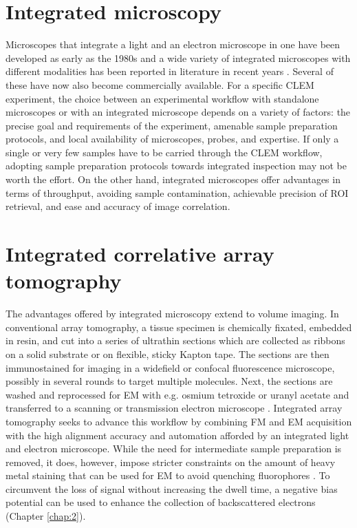 \section{Integrated microscopy}
\label{sec:1_integrated}

Microscopes that integrate a light and an electron microscope in one have been developed as early as the 1980s and a wide variety of integrated microscopes with different modalities has been reported in literature in recent years \cite{zonnevylle2013integration, timmermans2015contributed}. Several of these have now also become commercially available. For a specific CLEM experiment, the choice between an experimental workflow with standalone microscopes or with an integrated microscope depends on a variety of factors: the precise goal and requirements of the experiment, amenable sample preparation protocols, and local availability of microscopes, probes, and expertise. If only a single or very few samples have to be carried through the CLEM workflow, adopting sample preparation protocols towards integrated inspection may not be worth the effort. On the other hand, integrated microscopes offer advantages in terms of throughput, avoiding sample contamination, achievable precision of ROI retrieval, and ease and accuracy of image correlation.


\section{Integrated correlative array tomography}
\label{sec:1_iCAT}

The advantages offered by integrated microscopy extend to volume imaging. In conventional array tomography, a tissue specimen is chemically fixated, embedded in resin, and cut into a series of ultrathin sections which are collected as ribbons on a solid substrate or on flexible, sticky Kapton tape. The sections are then immunostained for imaging in a widefield or confocal fluorescence microscope, possibly in several rounds to target multiple molecules. Next, the sections are washed and reprocessed for EM with e.g. osmium tetroxide or uranyl acetate and transferred to a scanning or transmission electron microscope \cite{micheva2007array, wacker2013array}. Integrated array tomography seeks to advance this workflow by combining FM and EM acquisition with the high alignment accuracy and automation afforded by an integrated light and electron microscope. While the need for intermediate sample preparation is removed, it does, however, impose stricter constraints on the amount of heavy metal staining that can be used for EM to avoid quenching fluorophores \cite{kuipers2015scanning, peddie2017correlative}. To circumvent the loss of signal without increasing the dwell time, a negative bias potential can be used to enhance the collection of backscattered electrons (Chapter \ref{chap:2}).


